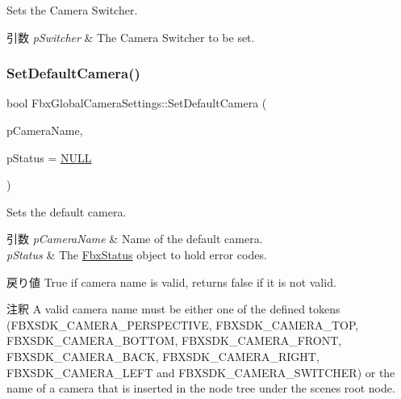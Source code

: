 Sets the Camera Switcher. 
\begin{DoxyParams}{引数}
{\em p\+Switcher} & The Camera Switcher to be set. \\
\hline
\end{DoxyParams}
\mbox{\label{class_fbx_global_camera_settings_a6069976325cb9983f6ed75e1884f1981}} 
\subsubsection{\texorpdfstring{Set\+Default\+Camera()}{SetDefaultCamera()}}
{\footnotesize\ttfamily bool Fbx\+Global\+Camera\+Settings\+::\+Set\+Default\+Camera (\begin{DoxyParamCaption}\item[{const char $\ast$}]{p\+Camera\+Name,  }\item[{\hyperlink{class_fbx_status}{Fbx\+Status} $\ast$}]{p\+Status = {\ttfamily \hyperlink{fbxarch_8h_a070d2ce7b6bb7e5c05602aa8c308d0c4}{N\+U\+LL}} }\end{DoxyParamCaption})}

Sets the default camera. 
\begin{DoxyParams}{引数}
{\em p\+Camera\+Name} & Name of the default camera. \\
\hline
{\em p\+Status} & The \hyperlink{class_fbx_status}{Fbx\+Status} object to hold error codes. \\
\hline
\end{DoxyParams}
\begin{DoxyReturn}{戻り値}
{\ttfamily True} if camera name is valid, returns {\ttfamily false} if it is not valid. 
\end{DoxyReturn}
\begin{DoxyRemark}{注釈}
A valid camera name must be either one of the defined tokens (F\+B\+X\+S\+D\+K\+\_\+\+C\+A\+M\+E\+R\+A\+\_\+\+P\+E\+R\+S\+P\+E\+C\+T\+I\+VE, F\+B\+X\+S\+D\+K\+\_\+\+C\+A\+M\+E\+R\+A\+\_\+\+T\+OP, F\+B\+X\+S\+D\+K\+\_\+\+C\+A\+M\+E\+R\+A\+\_\+\+B\+O\+T\+T\+OM, F\+B\+X\+S\+D\+K\+\_\+\+C\+A\+M\+E\+R\+A\+\_\+\+F\+R\+O\+NT, F\+B\+X\+S\+D\+K\+\_\+\+C\+A\+M\+E\+R\+A\+\_\+\+B\+A\+CK, F\+B\+X\+S\+D\+K\+\_\+\+C\+A\+M\+E\+R\+A\+\_\+\+R\+I\+G\+HT, F\+B\+X\+S\+D\+K\+\_\+\+C\+A\+M\+E\+R\+A\+\_\+\+L\+E\+FT and F\+B\+X\+S\+D\+K\+\_\+\+C\+A\+M\+E\+R\+A\+\_\+\+S\+W\+I\+T\+C\+H\+ER) or the name of a camera that is inserted in the node tree under the scene\textquotesingle{}s root node. 
\end{DoxyRemark}
\mbox{\label{class_fbx_global_camera_settings_a15790cd057733254a0e82b172b644122}} 
